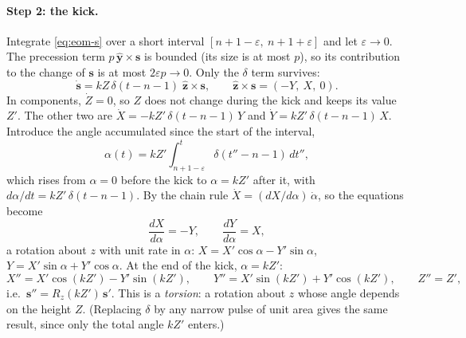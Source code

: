 \documentclass[11pt,a4paper]{article}
\newcommand{\vs}{\bm{s}}
\begin{document}
\paragraph{Step 2: the kick.} Integrate \eqref{eq:eom-s} over a short interval $[n+1-\varepsilon,\ n+1+\varepsilon]$
and let $\varepsilon\to0$. The precession term $p\,\hat{\bm y}\times\vs$ is bounded (its size is at most $p$), so
its contribution to the change of $\vs$ is at most $2\varepsilon p \to 0$. Only the $\delta$ term survives:
\begin{equation}\label{eq:kick-ode}
  \dot{\vs} = kZ\,\delta(t-n-1)\;\hat{\bm z}\times\vs, \qquad \hat{\bm z}\times\vs = (-Y,\ X,\ 0).
\end{equation}
In components, $\dot Z = 0$, so $Z$ does not change during the kick and keeps its value $Z'$. The other two are
$\dot X = -kZ'\,\delta(t-n-1)\,Y$ and $\dot Y = kZ'\,\delta(t-n-1)\,X$. Introduce the angle accumulated since the start of
the interval,
\begin{equation*}
  \alpha(t) = kZ'\int_{n+1-\varepsilon}^{t}\delta(t''-n-1)\,dt'' ,
\end{equation*}
which rises from $\alpha = 0$ before the kick to $\alpha = kZ'$ after it, with $d\alpha/dt = kZ'\,\delta(t-n-1)$. By
the chain rule $\dot X = (dX/d\alpha)\,\dot\alpha$, so the equations become
\begin{equation*}
  \frac{dX}{d\alpha} = -Y, \qquad \frac{dY}{d\alpha} = X ,
\end{equation*}
a rotation about $z$ with unit rate in $\alpha$: $X = X'\cos\alpha - Y'\sin\alpha$, $Y = X'\sin\alpha + Y'\cos\alpha$.
At the end of the kick, $\alpha = kZ'$:
\begin{equation}\label{eq:torsion}
  X'' = X'\cos(kZ') - Y'\sin(kZ'), \qquad Y'' = X'\sin(kZ') + Y'\cos(kZ'), \qquad Z'' = Z' ,
\end{equation}
i.e.\ $\vs'' = R_z(kZ')\,\vs'$. This is a \emph{torsion}: a rotation about $z$ whose angle depends on the height $Z$.
(Replacing $\delta$ by any narrow pulse of unit area gives the same result, since only the total angle $kZ'$
enters.)
\end{document}
